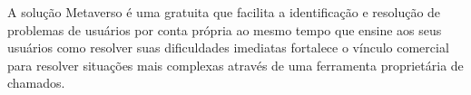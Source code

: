 		A solução Metaverso é uma gratuita que facilita a identificação e resolução de problemas de usuários por conta própria ao mesmo tempo que ensine aos seus usuários como resolver suas dificuldades imediatas fortalece o vínculo comercial para resolver situações mais complexas através de uma ferramenta proprietária de chamados.
	

